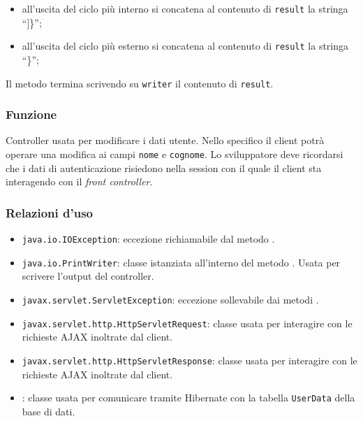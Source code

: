 \begin{description}
\begin{itemize}
\begin{itemize}
\begin{itemize}
				\item all'uscita del ciclo  più interno si concatena al contenuto di \texttt{result} la stringa ``]\}'';
				\item all'uscita del ciclo  più esterno si concatena al contenuto di \texttt{result} la stringa ``\}'';
			\end{itemize}
		\end{itemize}
	\end{itemize}
	Il metodo termina scrivendo su \texttt{writer} il contenuto di \texttt{result}.	
	
\end{description}


\subsubsection*{Funzione}
Controller usata per modificare i dati utente. Nello specifico il client potrà operare una modifica ai campi \texttt{nome} e \texttt{cognome}. Lo sviluppatore deve ricordarsi che i dati di autenticazione risiedono nella session con il quale il client sta interagendo con il \textit{front controller}.

\subsubsection*{Relazioni d'uso}

\begin{itemize}
	\item \texttt{java.io.IOException}: eccezione richiamabile dal metodo .
	\item \texttt{java.io.PrintWriter}: classe istanziata all'interno del metodo . Usata per scrivere l'output del controller.
	\item \texttt{javax.servlet.ServletException}: eccezione sollevabile dai metodi .
	\item \texttt{javax.servlet.http.HttpServletRequest}: classe usata per interagire con le richieste AJAX inoltrate dal client.
	\item \texttt{javax.servlet.http.HttpServletResponse}: classe usata per interagire con le richieste AJAX inoltrate dal client.
	\item {}: classe usata per comunicare tramite Hibernate con la tabella \texttt{UserData} della base di dati.
\end{itemize}

